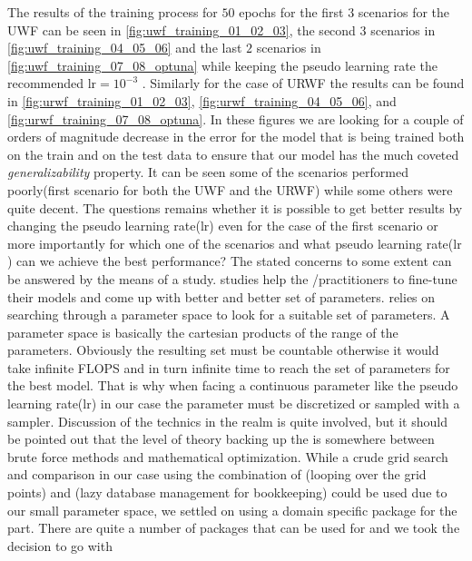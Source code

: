 The results of the training process for $50$ epochs for the first $3$ scenarios for the \ac{UWF} can be seen in \cref{fig:uwf_training_01_02_03}, the second $3$ scenarios in \cref{fig:uwf_training_04_05_06} and the 
last $2$ scenarios in \cref{fig:uwf_training_07_08_optuna} while keeping the pseudo learning rate the recommended $\mathrm{lr}=10^{-3}$ \cite{Kingma2014}\cite{Sun2019}. 
Similarly for the case of \ac{URWF} the results can be found in \cref{fig:urwf_training_01_02_03}, \cref{fig:urwf_training_04_05_06}, and \cref{fig:urwf_training_07_08_optuna}. 
In these figures we are looking for a couple of orders of magnitude decrease in the error for the model that is being trained both on the train 
and on the test data to ensure that our model has the much coveted \emph{generalizability} property. It can be seen some of the 
scenarios performed poorly(first scenario for both the \ac{UWF} and the \ac{URWF}) while some others were quite decent. The questions remains whether it is possible 
to get better results by changing the pseudo learning rate($\mathrm{lr}$) even for the case of the first scenario or more importantly 
for which one of the scenarios and what pseudo learning rate($\mathrm{lr}$) can we achieve the best performance? The stated concerns to some extent can be answered by the means of a 
\ho \cite{Hutter2019}\cite{Akiba2019} study. \HO studies help the \ml/\dl practitioners to fine-tune their models and come up with better and better set of 
parameters. \HO relies on searching through a parameter space to look for a suitable set of parameters. A parameter space is basically the cartesian 
products of the range of the parameters. Obviously the resulting set must be countable otherwise it would take infinite FLOPS and in turn infinite time to 
reach the set of parameters for the best model. That is why when facing a continuous parameter like the pseudo learning rate($\mathrm{lr}$) 
in our case the parameter must be discretized or sampled with a sampler. Discussion of the technics in the \ho realm is quite 
involved, but it should be pointed out that the level of theory backing up the \ho is somewhere between brute force methods and mathematical optimization. 
While a crude grid search and comparison in our case using the combination of \bash\cite{Ramey2022}\index{\bash}(looping over 
the grid points) and \awk\cite{Robbins2023}\index{\awk}(lazy database management for bookkeeping) could be used due to our 
small parameter space, we settled on using a domain specific package for the \ho\cite{Hutter2019}\cite{Akiba2019}\index{\ho} 
part. There are quite a number of packages that can be used for \ho\cite{Hutter2019}\cite{Akiba2019}\index{\ho} and we took the decision to go with 
